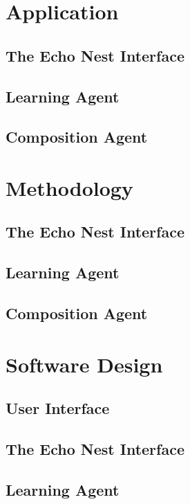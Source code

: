 \documentclass{article}
\begin{document}
\section{Application}
\subsection{The Echo Nest Interface}

\subsection{Learning Agent}

\subsection{Composition Agent}


\section{Methodology}
\subsection{The Echo Nest Interface}

\subsection{Learning Agent}

\subsection{Composition Agent}


\section{Software Design}
\subsection{User Interface}

\subsection{The Echo Nest Interface}

\subsection{Learning Agent}
\end{document}
